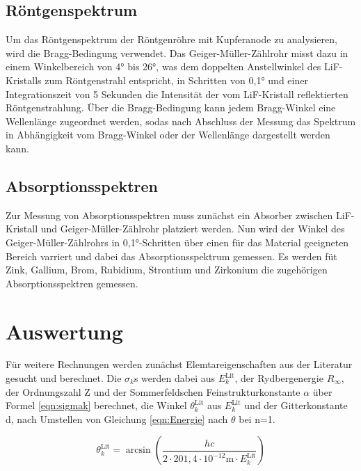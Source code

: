 \documentclass[titlepage = firstcover]{scrartcl}
\begin{document}
        \subsection{Röntgenspektrum}
          Um das Röntgenspektrum der Röntgenröhre mit Kupferanode zu analysieren, wird die Bragg-Bedingung verwendet. Das Geiger-Müller-Zählrohr misst dazu in einem Winkelbereich von 4° bis 26°, was
          dem doppelten Anstellwinkel des LiF-Kristalls zum Röntgenstrahl entspricht, in Schritten von 0,1° und einer Integrationszeit von 5 Sekunden die Intensität der vom LiF-Kristall reflektierten 
          Röntgenstrahlung. Über die Bragg-Bedingung kann jedem Bragg-Winkel eine Wellenlänge zugeordnet werden, sodas nach Abschluss der Messung das Spektrum in Abhängigkeit vom Bragg-Winkel oder der
          Wellenlänge dargestellt werden kann.


        \subsection{Absorptionsspektren}
          Zur Messung von Absorptionsspektren muss zunächst ein Absorber zwischen LiF-Kristall und Geiger-Müller-Zählrohr platziert werden. Nun wird der Winkel des Geiger-Müller-Zählrohrs in 
          0,1°-Schritten über einen für das Material geeigneten Bereich varriert und dabei das Absorptionsspektrum gemessen. Es werden füt Zink, Gallium, Brom, Rubidium, Strontium und Zirkonium
          die zugehörigen Absorptionsspektren gemessen.
          

    
    \section{Auswertung}
        
        Für weitere Rechnungen werden zunächst Elemtareigenschaften aus der Literatur gesucht und berechnet. Die $\sigma_k$s werden dabei aus $E_k^{\text{Lit}}$, der Rydbergenergie $R_{\infty}$, der 
        Ordnungszahl Z und der Sommerfeldschen Feinstrukturkonstante $\alpha$ über Formel \ref{eqn:sigmak} berechnet, die Winkel $\theta_k^{\text{Lit}}$ aus $E_k^{\text{Lit}}$ und der Gitterkonstante d, nach
        Umstellen von Gleichung \ref{eqn:Energie} nach $\theta$ bei n=1.
        
        \begin{equation*}
          \theta_k^{\text{Lit}} = \arcsin\left(\frac{hc}{2 \cdot 201,4 \cdot 10^{-12} \text{m} \cdot E_k^{\text{Lit}}}\right)
        \end{equation*}
        
\end{document}
